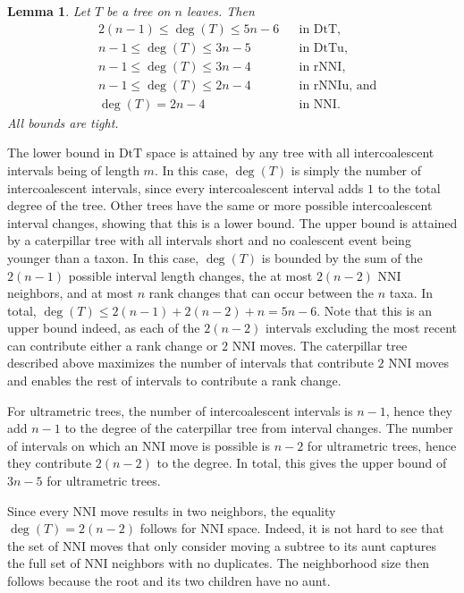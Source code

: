 \documentclass{amsart}
\newtheorem{lemma}{Lemma}
\theoremstyle{definition}
\newcommand{\nni}{\mathrm{NNI}}
\newcommand{\rnni}{\mathrm{rNNI}}
\newcommand{\rnniu}{\mathrm{rNNIu}}
\newcommand{\mdts}{\mathrm{DtT}}
\newcommand{\mdtsu}{\mathrm{DtTu}}
\begin{document}
\begin{lemma}\label{neighBound}
Let $T$ be a tree on $n$ leaves.
Then
\begin{align*}
& 2(n-1) \leq \deg(T) \leq 5n-6	&& \mbox{in $\mdts$,}\\
& n-1 \leq \deg(T) \leq 3n-5	&& \mbox{in $\mdtsu$,}\\
& n-1\leq \deg(T) \leq3n-4 	&& \mbox{in $\rnni$,}\\
& n-1 \leq \deg(T) \leq 2n-4 	&& \mbox{in $\rnniu$, and}\\
& \deg(T) = 2n-4 		&& \mbox{in $\nni$.}
\end{align*}
All bounds are tight.
\end{lemma}

\proof
The lower bound in $\mdts$ space is attained by any tree with all intercoalescent intervals being of length $m$.
In this case, $\deg(T)$ is simply the number of intercoalescent intervals, since every intercoalescent interval adds $1$ to the total degree of the tree.
Other trees have the same or more possible intercoalescent interval changes, showing that this is a lower bound.
The upper bound is attained by a caterpillar tree with all intervals short and no coalescent event being younger than a taxon.
In this case, $\deg(T)$ is bounded by the sum of the $2(n-1)$ possible interval length changes, the at most $2(n-2)$ NNI neighbors, and at most $n$ rank changes that can occur between the $n$ taxa.
In total, $\deg(T) \le 2(n-1) + 2(n-2) + n = 5n-6$.
Note that this is an upper bound indeed, as each of the $2(n-2)$ intervals excluding the most recent can contribute either a rank change or $2$ NNI moves.
The caterpillar tree described above maximizes the number of intervals that contribute $2$ NNI moves and enables the rest of intervals to contribute a rank change.

For ultrametric trees, the number of intercoalescent intervals is $n-1$, hence they add $n-1$ to the degree of the caterpillar tree from interval changes.
The number of intervals on which an NNI move is possible is $n-2$ for ultrametric trees, hence they contribute $2(n-2)$ to the degree.
In total, this gives the upper bound of $3n-5$ for ultrametric trees.

Since every NNI move results in two neighbors, the equality $\deg(T) = 2(n-2)$ follows for $\nni$ space.
Indeed, it is not hard to see that the set of NNI moves that only consider moving a subtree to its aunt captures the full set of NNI neighbors with no duplicates.
The neighborhood size then follows because the root and its two children have no aunt.
\end{document}
